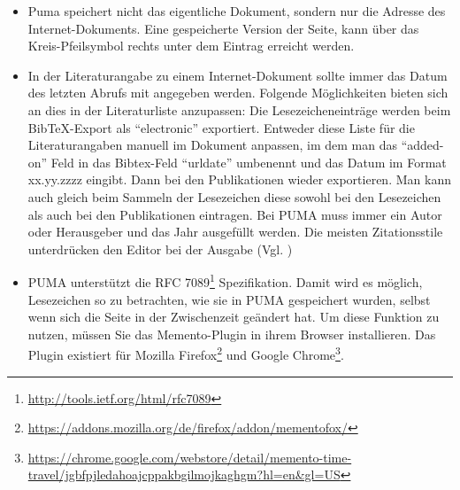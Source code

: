 \begin{itemize}
    \item Puma speichert nicht das eigentliche Dokument, sondern nur die Adresse des Internet-Dokuments. Eine gespeicherte Version der Seite, kann über das Kreis-Pfeilsymbol rechts unter dem Eintrag erreicht werden.
    \item In der Literaturangabe zu einem Internet-Dokument sollte immer das Datum des letzten Abrufs mit angegeben werden. Folgende Möglichkeiten bieten sich an dies in der Literaturliste anzupassen: Die Lesezeicheneinträge werden beim BibTeX-Export als \enquote{electronic} exportiert. Entweder diese Liste für die Literaturangaben manuell im Dokument anpassen, im dem man das \enquote{added-on} Feld in das Bibtex-Feld \enquote{urldate} umbenennt und das Datum im Format xx.yy.zzzz eingibt. \autocite[Vgl. das Benutzerhandbuch zum BibLaTeX Paket][S.10 (der Eingabetyp \enquote{online} wird synonym zu \enquote{electronic} verwendet. Damit der Zitationsstil das Abrufdatum hinzufügt muss das Feld urldate ausgefüllt sein.)]{lehmann2016biblatex} Dann bei den Publikationen wieder exportieren. Man kann auch gleich beim Sammeln der Lesezeichen diese sowohl bei den Lesezeichen als auch bei den Publikationen eintragen. Bei PUMA muss immer ein Autor oder Herausgeber und das Jahr ausgefüllt werden. Die meisten Zitationsstile unterdrücken den Editor bei der Ausgabe (Vgl. )
    \item PUMA unterstützt die RFC 7089\footnote{\url{http://tools.ietf.org/html/rfc7089}} Spezifikation. Damit wird es möglich, Lesezeichen so zu betrachten, wie sie in PUMA gespeichert wurden, selbst wenn sich die Seite in der Zwischenzeit geändert hat. Um diese Funktion zu nutzen, müssen Sie das Memento-Plugin in ihrem Browser installieren. Das Plugin existiert für Mozilla Firefox\footnote{\url{https://addons.mozilla.org/de/firefox/addon/mementofox/}} und Google Chrome\footnote{\url{https://chrome.google.com/webstore/detail/memento-time-travel/jgbfpjledahoajcppakbgilmojkaghgm?hl=en&gl=US}}. 
\end{itemize}
